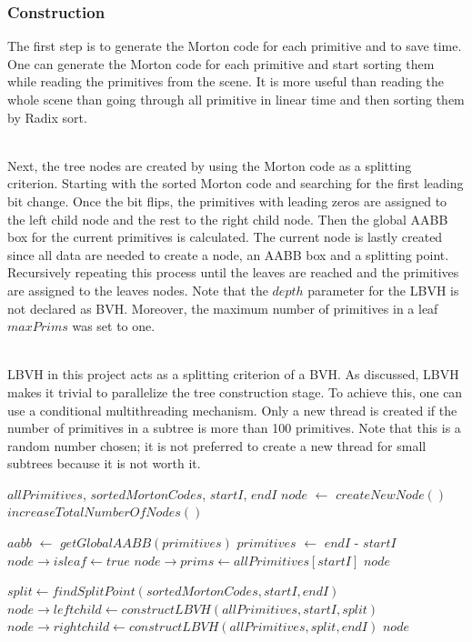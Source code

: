 \documentclass[11pt,a4paper]{article}
\begin{document}
\subsubsection{Construction}
The first step is to generate the Morton code for each primitive and to save time. One can generate the Morton code for each primitive and start sorting them while reading the primitives from the scene. It is more useful than reading the whole scene than going through all primitive in linear time and then sorting them by Radix sort.

\noindent
\\
Next, the tree nodes are created by using the Morton code as a splitting criterion. Starting with the sorted Morton code and searching for the first leading bit change. Once the bit flips, the primitives with leading zeros are assigned to the left child node and the rest to the right child node. Then the global AABB box for the current primitives is calculated. The current node is lastly created since all data are needed to create a node, an AABB box and a splitting point. Recursively repeating this process until the leaves are reached and the primitives are assigned to the leaves nodes. Note that the $depth$ parameter for the LBVH is not declared as BVH. Moreover, the maximum number of primitives in a leaf $maxPrims$ was set to one.

\noindent
\\
LBVH in this project acts as a splitting criterion of a BVH. As discussed, LBVH makes it trivial to parallelize the tree construction stage. To achieve this, one can use a conditional multithreading mechanism. Only a new thread is created if the number of primitives in a subtree is more than 100 primitives. Note that this is a random number chosen; it is not preferred to create a new thread for small subtrees because it is not worth it.


\begin{algorithm}[H]
\caption{$constructLBVH$}\label{alg:alg1}
\begin{algorithmic}
		\Require $allPrimitives$, $sortedMortonCodes$, $startI$, $endI$
\State $node$ $\gets$ $createNewNode()$
\State $increaseTotalNumberOfNodes()$

\State $aabb$ $\gets$ $getGlobalAABB(primitives)$
\State $primitives$ $\gets$  $endI$ - $startI$
	\State $node \rightarrow isleaf \gets true$
	\State $node \rightarrow prims \gets allPrimitives[startI]$
	\State \Return $node$
\EndIf

\State $split \gets findSplitPoint(sortedMortonCodes, startI, endI)$
\State $node \rightarrow leftchild  \gets constructLBVH(allPrimitives, startI, split)$
\State $node \rightarrow rightchild  \gets constructLBVH(allPrimitives, split, endI)$
\State \Return $node$
\end{algorithmic}
\end{algorithm}
\clearpage
\end{document}
